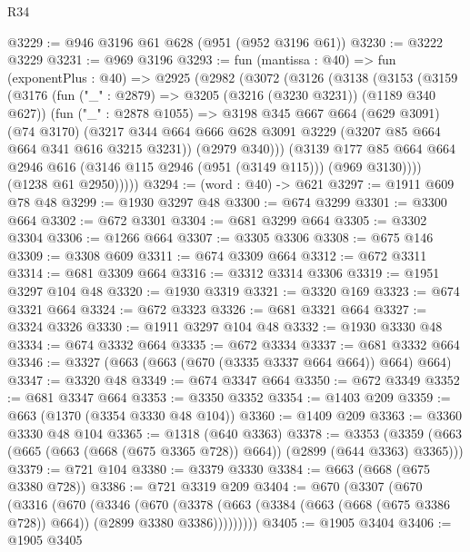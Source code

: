 \begin{lexlean}{R34}
\begin{coremodule}
@3229 := @946 @3196 @61 @628 (@951 (@952 @3196 @61))
@3230 := @3222 @3229
@3231 := @969 @3196
@3293 := fun (mantissa : @40) =>
  fun (exponentPlus : @40) =>
  @2925
    (@2982
      (@3072
        (@3126
          (@3138
            (@3153
              (@3159
                (@3176
                  (fun ("_" : @2879) => @3205 (@3216 (@3230 @3231)) (@1189 @340 @627))
                  (fun ("_" : @2878 @1055) =>
                  @3198
                    @345
                    @667
                    @664
                    (@629 @3091)
                    (@74 @3170)
                    (@3217
                      @344
                      @664
                      @666
                      @628
                      @3091
                      @3229
                      (@3207 @85 @664 @664 @341 @616 @3215 @3231))
                    (@2979 @340)))
                (@3139
                  @177
                  @85
                  @664
                  @664
                  @2946
                  @616
                  (@3146 @115 @2946 (@951 (@3149 @115)))
                  (@969 @3130))))
            (@1238 @61 @2950)))))
@3294 := (word : @40) -> @621
@3297 := @1911 @609 @78 @48
@3299 := @1930 @3297 @48
@3300 := @674 @3299
@3301 := @3300 @664
@3302 := @672 @3301
@3304 := @681 @3299 @664
@3305 := @3302 @3304
@3306 := @1266 @664
@3307 := @3305 @3306
@3308 := @675 @146
@3309 := @3308 @609
@3311 := @674 @3309 @664
@3312 := @672 @3311
@3314 := @681 @3309 @664
@3316 := @3312 @3314 @3306
@3319 := @1951 @3297 @104 @48
@3320 := @1930 @3319
@3321 := @3320 @169
@3323 := @674 @3321 @664
@3324 := @672 @3323
@3326 := @681 @3321 @664
@3327 := @3324 @3326
@3330 := @1911 @3297 @104 @48
@3332 := @1930 @3330 @48
@3334 := @674 @3332 @664
@3335 := @672 @3334
@3337 := @681 @3332 @664
@3346 := @3327 (@663 (@663 (@670 (@3335 @3337 @664 @664)) @664) @664)
@3347 := @3320 @48
@3349 := @674 @3347 @664
@3350 := @672 @3349
@3352 := @681 @3347 @664
@3353 := @3350 @3352
@3354 := @1403 @209
@3359 := @663 (@1370 (@3354 @3330 @48 @104))
@3360 := @1409 @209
@3363 := @3360 @3330 @48 @104
@3365 := @1318 (@640 @3363)
@3378 := @3353 (@3359 (@663 (@665 (@663 (@668 (@675 @3365 @728)) @664)) (@2899 (@644 @3363) @3365)))
@3379 := @721 @104
@3380 := @3379 @3330
@3384 := @663 (@668 (@675 @3380 @728))
@3386 := @721 @3319 @209
@3404 := @670
    (@3307
      (@670
        (@3316
          (@670
            (@3346
              (@670
                (@3378
                  (@663 (@3384 (@663 (@668 (@675 @3386 @728)) @664)) (@2899 @3380 @3386)))))))))
@3405 := @1905 @3404
@3406 := @1905 @3405

\end{coremodule}
\end{lexlean}
